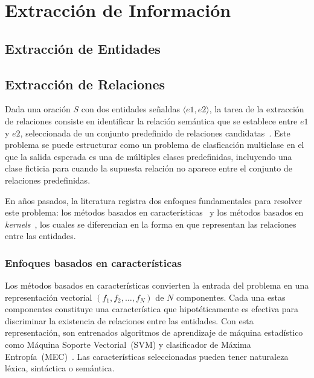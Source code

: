 \chapter{Extracción de Información}\label{chapter:information_extraction}

\section{Extracción de Entidades}

\section{Extracción de Relaciones}

Dada una oración $S$ con dos entidades señaldas $\langle e1,e2 \rangle$, la tarea de la extracción de relaciones consiste en identificar la relación semántica que se establece entre $e1$ y $e2$, seleccionada de un conjunto predefinido de relaciones candidatas~\cite{hendrickx2009semeval}.
Este problema se puede estructurar como un problema de clasficación multiclase en el que la salida esperada es una de múltiples clases predefinidas, incluyendo una clase ficticia para cuando la supuesta relación no aparece entre el conjunto de relaciones predefinidas.

En años pasados, la literatura registra dos enfoques fundamentales para resolver este problema: los métodos basados en características~\cite{kambhatla2004combining, boschee2005automatic, guodong2005exploring, grishman2005nyu, jiang2007systematic, chan2010exploiting, rink2010utd, sun2011semi, rink2010utd, nguyen2014employing} y los métodos basados en \textit{kernels}~\cite{zelenko2003kernel, culotta2004dependency, bunescu2005shortest, qian2008exploiting, nguyen2009convolution, sun2014feature}, los cuales se diferencian en la forma en que representan las relaciones entre las entidades.

\subsection{Enfoques basados en características}

Los métodos basados en características convierten la entrada del problema en una representación vectorial $(f_1,f_2,\dots,f_N)$ de $N$ componentes.
Cada una estas componentes constituye una característica que hipotéticamente es efectiva para discriminar la existencia de relaciones entre las entidades.
Con esta representación, son entrenados algoritmos de aprendizaje de máquina estadístico como Máquina Soporte Vectorial~(SVM)\cite{cortes1995support} y clasificador de Máxima Entropía~(MEC)~\cite{maxentropy}.
Las características seleccionadas pueden tener naturaleza léxica, sintáctica o semántica.

